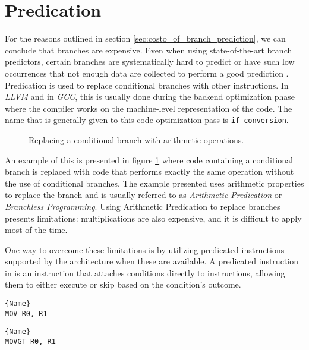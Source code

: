 \section{Predication}
\label{sec:predication}

For the reasons outlined in section \ref{sec:costo_of_branch_prediction}, we can conclude that branches are expensive. Even when using state-of-the-art branch predictors, certain branches are systematically hard to predict or have such low occurrences that not enough data are collected to perform a good prediction \cite{lin2019branch}.
Predication is used to replace conditional branches with other instructions. In \textit{LLVM} and in \textit{GCC}, this is usually done during the backend optimization phase where the compiler works on the machine-level representation of the code. The name that is generally given to this code optimization pass is \texttt{if-conversion}.

\begin{figure}[h!]
\centering

\caption[Replacing a Conditional Branch with Arithmetic Operations]{Replacing a conditional branch with arithmetic operations.}
\label{fig:branching_predication_example}
\end{figure}

An example of this is presented in figure \ref{fig:branching_predication_example} where code containing a conditional branch is replaced with code that performs exactly the same operation without the use of conditional branches. The example presented uses arithmetic properties to replace the branch and is usually referred to as \textit{Arithmetic Predication} or \textit{Branchless Programming}. Using Arithmetic Predication to replace branches presents limitations: multiplications are also expensive, and it is difficult to apply most of the time.

One way to overcome these limitations is by utilizing predicated instructions supported by the architecture when these are available. A predicated instruction in \armvs is an instruction that attaches conditions directly to instructions, allowing them to either execute or skip based on the condition's outcome. \newline

\noindent\begin{minipage}{.45\textwidth}
\begin{lstlisting}[caption=Standard MOV in ARMv7 assembly, style=AsmStyle, label={lst:add}]{Name}
MOV R0, R1
\end{lstlisting}
\end{minipage}\hfill
\begin{minipage}{.45\textwidth}
\begin{lstlisting}[caption=Predicated MOV in ARMv7 assembly, style=AsmStyle, label={lst:cadd}]{Name}
MOVGT R0, R1
\end{lstlisting}
\end{minipage}

